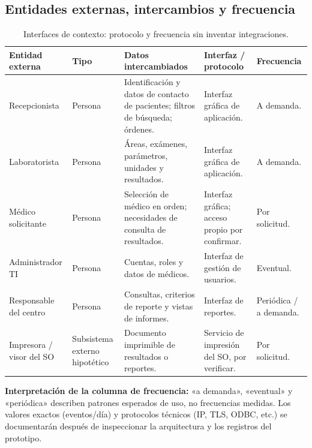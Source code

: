 \subsection{Entidades externas, intercambios y frecuencia}
\begin{table}[H]\centering\scriptsize
\caption{Interfaces de contexto: protocolo y frecuencia sin inventar integraciones.}\label{tab:interfaces}
\begin{tabularx}{\linewidth}{@{}p{2.4cm}p{2.5cm}Xp{2.7cm}p{1.7cm}@{}}\toprule
\textbf{Entidad externa} & \textbf{Tipo} & \textbf{Datos intercambiados} & \textbf{Interfaz / protocolo} & \textbf{Frecuencia}\\\midrule
Recepcionista & Persona & Identificación y datos de contacto de pacientes; filtros de búsqueda; órdenes. & Interfaz gráfica de aplicación. & A demanda.\\
Laboratorista & Persona & Áreas, exámenes, parámetros, unidades y resultados. & Interfaz gráfica de aplicación. & A demanda.\\
Médico solicitante & Persona & Selección de médico en orden; necesidades de consulta de resultados. & Interfaz gráfica; acceso propio por confirmar. & Por solicitud.\\
Administrador TI & Persona & Cuentas, roles y datos de médicos. & Interfaz de gestión de usuarios. & Eventual.\\
Responsable del centro & Persona & Consultas, criterios de reporte y vistas de informes. & Interfaz de reportes. & Periódica / a demanda.\\
Impresora / visor del SO & Subsistema externo hipotético & Documento imprimible de resultados o reportes. & Servicio de impresión del SO, por verificar. & Por solicitud.\\\bottomrule
\end{tabularx}
\end{table}
\textbf{Interpretación de la columna de frecuencia:} «a demanda», «eventual» y «periódica» describen patrones esperados de uso, no frecuencias medidas. Los valores exactos (eventos/día) y protocolos técnicos (IP, TLS, ODBC, etc.) se documentarán después de inspeccionar la arquitectura y los registros del prototipo.


